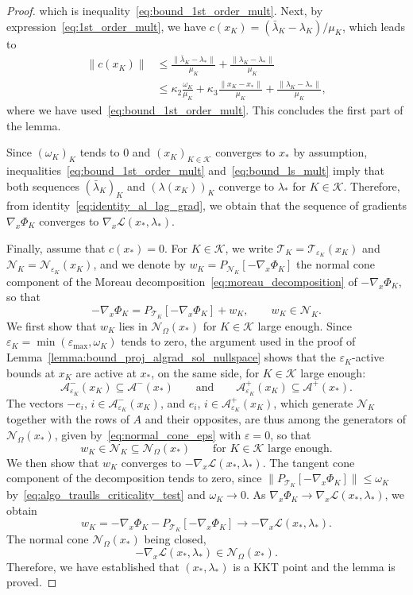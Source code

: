 \documentclass[pdflatex,sn-mathphys-num]{sn-jnl}%
\theoremstyle{thmstyleone}%
\newcommand{\calA}{{\mathcal{A}}}
\newcommand{\calL}{{\mathcal{L}}}
\newcommand{\calK}{{\mathcal{K}}}
\newcommand{\calN}{{\mathcal{N}}}
\newcommand{\calT}{{\mathcal{T}}}
\newcommand{\proj}[2]{P_{#1} \left[ {#2} \right]} %
\begin{document}
\begin{proof}
	which is inequality~\eqref{eq:bound_1st_order_mult}. 
	Next, by expression~\eqref{eq:1st_order_mult}, we have $c(x_K) = (\bar \lambda_K - \lambda_K) / \mu_K$, which leads to
	\begin{equation*}
		\begin{split}
			\|c(x_K) \| & \le \frac{\|\bar \lambda_K - \lambda_* \|}{\mu_K} + \frac{\|\lambda_K - \lambda_* \|}{\mu_K} \\
			& \le \kappa_2 \frac{\omega_K}{\mu_K} + \kappa_3 \frac{\|x_K-x_*\|}{\mu_K} + \frac{\|\lambda_K - \lambda_* \|}{\mu_K},
		\end{split}
	\end{equation*}
	where we have used~\eqref{eq:bound_1st_order_mult}.
	This concludes the first part of the lemma. 
	
	Since $(\omega_K)_K$ tends to $0$ and $(x_K)_{K\in \calK}$ converges to $x_*$ by assumption, inequalities~\eqref{eq:bound_1st_order_mult} and~\eqref{eq:bound_ls_mult} imply that both sequences $(\bar \lambda_K)_K$ and $(\lambda(x_K))_K$ converge to $\lambda_*$ for $K \in \calK$. Therefore, from identity~\eqref{eq:identity_al_lag_grad}, we obtain that the sequence of gradients $\nabla_x \Phi_K$ converges to $\nabla_x \calL(x_*,\lambda_*)$. 
	
	Finally, assume that $c(x_*) = 0$. For $K \in \calK$, we write $\calT_K = \calT_{\varepsilon_K}(x_K)$ and $\calN_K = \calN_{\varepsilon_K}(x_K)$, and we denote by $w_K = \proj{\calN_K}{-\nabla_x\Phi_K}$ the normal cone component of the Moreau decomposition~\eqref{eq:moreau_decomposition} of $-\nabla_x\Phi_K$, so that
	\[-\nabla_x\Phi_K = \proj{\calT_K}{-\nabla_x\Phi_K} + w_K, \qquad w_K \in \calN_K.\]
	We first show that $w_K$ lies in $\calN_\Omega(x_*)$ for $K \in \calK$ large enough. Since $\varepsilon_K = \min(\varepsilon_{\max},\omega_K)$ tends to zero, the argument used in the proof of Lemma~\ref{lemma:bound_proj_algrad_sol_nullspace} shows that the $\varepsilon_K$-active bounds at $x_K$ are active at $x_*$, on the same side, for $K \in \calK$ large enough:
	\[\calA^-_{\varepsilon_K}(x_K) \subseteq \calA^-(x_*) \qquad \text{and} \qquad \calA^+_{\varepsilon_K}(x_K) \subseteq \calA^+(x_*).\]
	The vectors $-e_i$, $i \in \calA^-_{\varepsilon_K}(x_K)$, and $e_i$, $i \in \calA^+_{\varepsilon_K}(x_K)$, which generate $\calN_K$ together with the rows of $A$ and their opposites, are thus among the generators of $\calN_\Omega(x_*)$, given by~\eqref{eq:normal_cone_eps} with $\varepsilon = 0$, so that
	\[w_K \in \calN_K \subseteq \calN_\Omega(x_*) \qquad \text{for } K \in \calK \text{ large enough}.\]
	We then show that $w_K$ converges to $-\nabla_x\calL(x_*,\lambda_*)$. The tangent cone component of the decomposition tends to zero, since $\|\proj{\calT_K}{-\nabla_x\Phi_K}\| \le \omega_K$ by~\eqref{eq:algo_traulls_criticality_test} and $\omega_K \to 0$. As $\nabla_x\Phi_K \to \nabla_x\calL(x_*,\lambda_*)$, we obtain
	\[w_K = -\nabla_x\Phi_K - \proj{\calT_K}{-\nabla_x\Phi_K} \to -\nabla_x\calL(x_*,\lambda_*).\]
	The normal cone $\calN_\Omega(x_*)$ being closed,
	\[-\nabla_x\calL(x_*,\lambda_*) \in \calN_\Omega(x_*).\]
	Therefore, we have established that $(x_*,\lambda_*)$ is a KKT point and the lemma is proved.
\end{proof}
\end{document}
